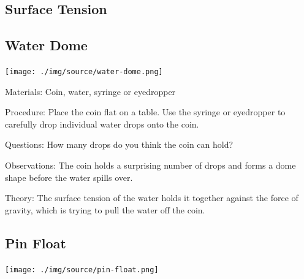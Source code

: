 \begin{multicols}{2}
\columnbreak


\section*{Surface Tension}


\subsection{Water Dome}

\begin{center}
\texttt{[image: ./img/source/water-dome.png]}
\end{center}

\begin{description*}
\item[Materials:]{Coin, water, syringe or eyedropper}
\item[Procedure:]{Place the coin flat on a table. Use the syringe or eyedropper to carefully drop individual water drops onto the coin.}
\item[Questions:]{How many drops do you think the coin can hold?}
\item[Observations:]{The coin holds a surprising number of drops and forms a dome shape before the water spills over.}
\item[Theory:]{The surface tension of the water holds it together against the force of gravity, which is trying to pull the water off the coin.}
\end{description*}

\subsection{Pin Float}

\begin{center}
\texttt{[image: ./img/source/pin-float.png]}
\end{center}


\end{multicols}
